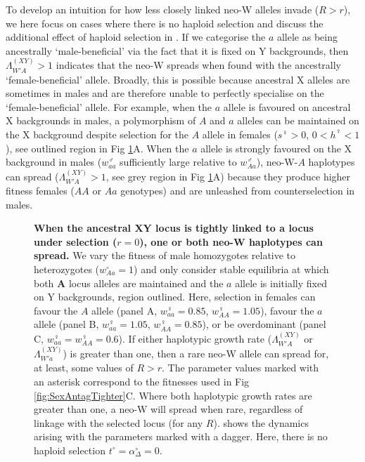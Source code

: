 \documentclass[10pt,letterpaper]{article}
\begin{document}
To develop an intuition for how less closely linked neo-W alleles invade ($R>r$), we here focus on cases where there is no haploid selection and discuss the additional effect of haploid selection in . 
If we categorise the $a$ allele as being ancestrally `male-beneficial' via the fact that it is fixed on Y backgrounds, then $\Lambda_{W'A}^{(XY)}>1$ indicates that the neo-W spreads when found with the ancestrally `female-beneficial' allele. 
Broadly, this is possible because ancestral X alleles are sometimes in males and are therefore unable to perfectly specialise on the `female-beneficial' allele. 
For example, when the $a$ allele is favoured on ancestral X backgrounds in males, a polymorphism of $A$ and $a$ alleles can be maintained on the X background despite selection for the $A$ allele in females ($s^\female>0$, $0<h^\female<1$), see outlined region in Fig \ref{fig:regionplots}A. 
When the $a$ allele is strongly favoured on the X background in males ($w_{aa}^\male$ sufficiently large relative to $w_{Aa}^\male$), neo-W-$A$ haplotypes can spread ($\Lambda_{W'A}^{(XY)}>1$, see grey region in Fig \ref{fig:regionplots}A) because they produce higher fitness females ($AA$ or $Aa$ genotypes) and are unleashed from counterselection in males. 

\begin{figure}[!h]
\centering
\caption{
{\bf When the ancestral XY locus is tightly linked to a locus under selection ($r=0$), one or both neo-W haplotypes can spread. }
We vary the fitness of male homozygotes relative to heterozygotes ($w_{Aa}^\circ=1$) and only consider stable equilibria at which both $\mathbf{A}$ locus alleles are maintained and the $a$ allele is initially fixed on Y backgrounds, region outlined. 
Here, selection in females can favour the $A$ allele (panel A, $w_{aa}^\female=0.85$, $w_{AA}^\female=1.05$), favour the $a$ allele (panel B, $w_{aa}^\female=1.05$, $w_{AA}^\female=0.85$), or be overdominant (panel C, $w_{aa}^\female=w_{AA}^\female=0.6$). 
If either haplotypic growth rate ($\Lambda_{W'A}^{(XY)}$ or $\Lambda_{W'a}^{(XY)}$) is greater than one, then a rare neo-W allele can spread for, at least, some values of $R>r$. 
The parameter values marked with an asterisk correspond to the fitnesses used in Fig \ref{fig:SexAntagTighter}C. 
Where both haplotypic growth rates are greater than one, a neo-W will spread when rare, regardless of linkage with the selected locus (for any $R$). 
 shows the dynamics arising with the parameters marked with a dagger. 
Here, there is no haploid selection $t^\circ = \alpha^\circ_\Delta = 0$.
}
\label{fig:regionplots}
\end{figure}
\end{document}
